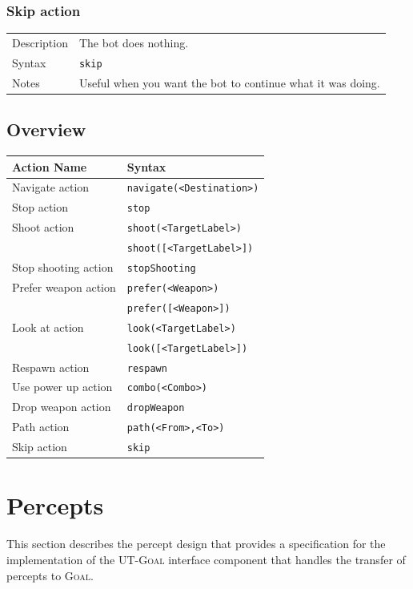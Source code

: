\documentclass[11pt,a4paper]{article}
\newcommand{\Goal}{\textsc{Goal}}
\begin{document}
\subsubsection*{Skip action} 	
\begin{small}
\begin{tabular}{p{2cm}p{9cm}}
Description & The bot does nothing.\\
Syntax & \verb|skip|\\
Notes & 
		Useful when you want the bot to continue what it was doing.\\
\end{tabular}
\end{small}

\subsection{Overview}
\label{sec:actionsoverview}

\begin{small}
\begin{tabular}{|p{4cm}|p{7cm}|}	
	\hline
Action Name			 & Syntax\\
\hline\hline
Navigate action 		& \verb|navigate(<Destination>)|\\
Stop action			& \verb|stop| \\
Shoot action 			& \verb|shoot(<TargetLabel>)| \\
				& \verb|shoot([<TargetLabel>])| \\
Stop shooting action 	& \verb|stopShooting| \\
Prefer weapon action 	& \verb|prefer(<Weapon>)|\\
				& \verb|prefer([<Weapon>])|\\
Look at action		& \verb|look(<TargetLabel>)|\\
				& \verb|look([<TargetLabel>])|\\
Respawn action		& \verb|respawn|\\
Use power up action	& \verb|combo(<Combo>)| \\
Drop weapon action 	& \verb|dropWeapon| \\
Path action			& \verb|path(<From>,<To>)|\\
Skip action			& \verb|skip|\\
\hline
\end{tabular}
\end{small}

\section{Percepts}
\label{sec:percepts}
This section describes the percept design that provides a specification for the implementation of the UT-{\Goal} interface component that handles the transfer of percepts to {\Goal}. 
\end{document}
